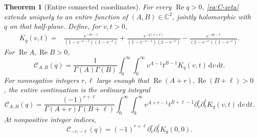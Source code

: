 \documentclass[11pt]{article}
\numberwithin{equation}{section}
\newtheorem{theorem}{Theorem}[section]
\theoremstyle{definition}
\DeclareMathOperator{\Rea}{Re}
\newcommand{\C}{\mathbb C}
\newcommand{\dd}{\,\mathrm d}
\newcommand{\CC}{\mathcal C}
\begin{document}
\begin{theorem}[Entire connected coordinates]\label{thm:entire-C}
For every $\Rea q>0$, \eqref{eq:C-zeta} extends uniquely to an entire function of $(A,B)\in\C^2$, jointly holomorphic with $q$ on that half-plane. Define, for $v,t>0$,
\begin{align}\label{eq:kernel}
 K_q(v,t)={}&\frac{e^{-2v-t}}{(1-e^{-v-t})(1-e^{-v})}
 +\frac{e^{-q(v+t)}}{(1-e^{-v-t})(1-e^{-t})}
 -\frac{e^{-qv-t}}{(1-e^{-v})(1-e^{-t})}.
\end{align}
For $\Rea A,\Rea B>0$,
\begin{equation}\label{eq:C-Mellin}
 \CC_{A,B}(q)=\frac1{\Gamma(A)\Gamma(B)}
 \int_0^\infty\!\int_0^\infty v^{A-1}t^{B-1}K_q(v,t)\dd v\dd t.
\end{equation}
For nonnegative integers $r,\ell$ large enough that $\Rea(A+r),\Rea(B+\ell)>0$, the entire continuation is the ordinary integral
\begin{equation}\label{eq:C-continuation}
 \CC_{A,B}(q)=\frac{(-1)^{r+\ell}}{\Gamma(A+r)\Gamma(B+\ell)}
 \int_0^\infty\!\int_0^\infty v^{A+r-1}t^{B+\ell-1}
 \partial_v^r\partial_t^\ell K_q(v,t)\dd v\dd t.
\end{equation}
At nonpositive integer indices,
\begin{equation}\label{eq:C-corner}
 \CC_{-r,-\ell}(q)=(-1)^{r+\ell}
 \partial_v^r\partial_t^\ell K_q(0,0).
\end{equation}
\end{theorem}
\end{document}
